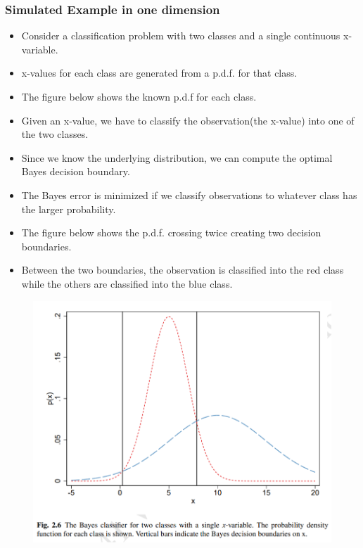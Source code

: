 \documentclass[12pt, oneside]{article}
\begin{document}
\subsubsection{Simulated Example in one dimension}
\begin{itemize}
    \item Consider a classification problem with two classes and a single continuous x-variable.
    \item x-values for each class are generated from a p.d.f. for that class.
    \item The figure below shows the known p.d.f for each class. 
    \item Given an x-value, we have to classify the observation(the x-value) into one of the two classes.
    \item Since we know the underlying distribution, we can compute the optimal Bayes decision boundary. 
    \item The Bayes error is minimized if we classify observations to whatever class has the larger probability.
    \item The figure below shows the p.d.f. crossing twice creating two decision boundaries. 
    \item Between the two boundaries, the observation is classified into the red class while the others are classified into the blue class.
\end{itemize}

\begin{figure}[!ht]
    \centering
    \includegraphics[width=\textwidth]{Bayes Classifier for two classes one x.png}        
\end{figure}
\end{document}
